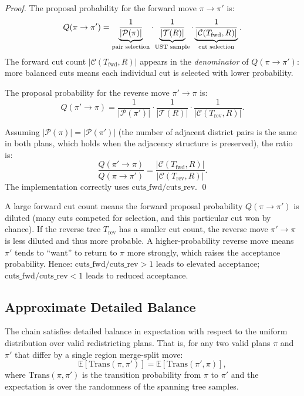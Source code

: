 \begin{proof}
The proposal probability for the forward move $\pi \to \pi'$ is:
\[
  Q(\pi \to \pi')
  = \underbrace{\frac{1}{|\mathcal{P}(\pi)|}}_{%
      \text{pair selection}}
  \cdot \underbrace{\frac{1}{|\mathcal{T}(R)|}}_{%
      \text{UST sample}}
  \cdot \underbrace{\frac{1}{|\mathcal{C}(T_{\mathrm{fwd}}, R)|}}_{%
      \text{cut selection}}.
\]
The forward cut count $|\mathcal{C}(T_{\mathrm{fwd}}, R)|$ appears in the
\emph{denominator} of $Q(\pi \to \pi')$: more balanced cuts means each
individual cut is selected with lower probability.

The proposal probability for the reverse move $\pi' \to \pi$ is:
\[
  Q(\pi' \to \pi)
  = \frac{1}{|\mathcal{P}(\pi')|}
  \cdot \frac{1}{|\mathcal{T}(R)|}
  \cdot \frac{1}{|\mathcal{C}(T_{\mathrm{rev}}, R)|}.
\]

Assuming $|\mathcal{P}(\pi)| = |\mathcal{P}(\pi')|$ (the number of
adjacent district pairs is the same in both plans, which holds when
the adjacency structure is preserved), the ratio is:
\[
  \frac{Q(\pi' \to \pi)}{Q(\pi \to \pi')}
  = \frac{|\mathcal{C}(T_{\mathrm{fwd}}, R)|}{|\mathcal{C}(T_{\mathrm{rev}}, R)|}.
\]
The implementation correctly uses
$\mathrm{cuts\_fwd} / \mathrm{cuts\_rev}$. \qed
\end{proof}

\begin{remark}
A large forward cut count means the forward proposal probability
$Q(\pi \to \pi')$ is diluted (many cuts competed for selection, and this
particular cut won by chance).
If the reverse tree $T_{\mathrm{rev}}$ has a smaller cut count, the reverse
move $\pi' \to \pi$ is less diluted and thus more probable.
A higher-probability reverse move means $\pi'$ tends to ``want'' to return
to $\pi$ more strongly, which raises the acceptance probability.
Hence: $\mathrm{cuts\_fwd} / \mathrm{cuts\_rev} > 1$ leads to elevated
acceptance; $\mathrm{cuts\_fwd} / \mathrm{cuts\_rev} < 1$ leads to reduced
acceptance.
\end{remark}

\subsection{Approximate Detailed Balance}

\begin{theorem}
\label{thm:approx-balance}
The \mergesplit{} chain satisfies detailed balance in expectation with
respect to the uniform distribution over valid redistricting plans.
That is, for any two valid plans $\pi$ and $\pi'$ that differ by a
single region merge-split move:
\[
  \mathbb{E}\!\left[
    \mathrm{Trans}(\pi, \pi')
  \right]
  = \mathbb{E}\!\left[
    \mathrm{Trans}(\pi', \pi)
  \right],
\]
where $\mathrm{Trans}(\pi, \pi')$ is the transition probability from $\pi$
to $\pi'$ and the expectation is over the randomness of the spanning tree
samples.
\end{theorem}

